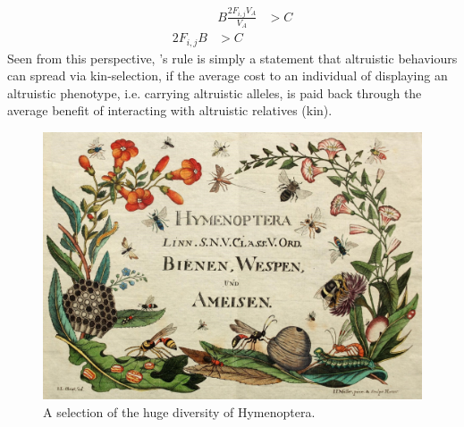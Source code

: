 \begin{eqnarray}
   & B\frac{2 F_{i,j} V_A}{V_A} &> C \nonumber  \\
  2 F_{i,j} B & > C 
\end{eqnarray}
Seen from this perspective, \citeauthor{hamilton1964genetical}'s rule
is simply a statement that altruistic behaviours can spread via
kin-selection, if the average cost to an individual of displaying an
altruistic phenotype, i.e. carrying altruistic alleles, is paid back through the average benefit of interacting with altruistic relatives (kin).

\begin{figure}
\begin{center}
\includegraphics[width= 0.75 \textwidth]{illustration_images/Quant_gen/Hymenoptera/Hymenoptera.jpg}
\end{center}
\caption{A selection of the huge diversity of  Hymenoptera.  } \label{Hymenoptera}
\end{figure}

